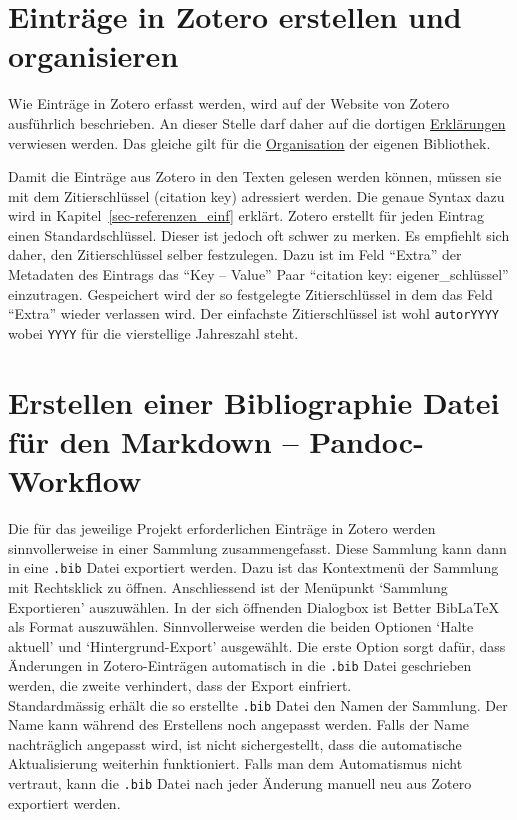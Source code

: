 \documentclass[
  nswissgerman,
  a4paper,
  DIV=11,
  numbers=noendperiod,
  ngerman]{scrreprt}
\begin{document}
\section{Einträge in Zotero erstellen und
organisieren}\label{eintruxe4ge-in-zotero-erstellen-und-organisieren}

Wie Einträge in Zotero erfasst werden, wird auf der Website von Zotero
ausführlich beschrieben. An dieser Stelle darf daher auf die dortigen
\href{https://www.zotero.org/support/adding_items_to_zotero}{Erklärungen}
verwiesen werden. Das gleiche gilt für die
\href{https://www.zotero.org/support/collections_and_tags}{Organisation}
der eigenen Bibliothek.

Damit die Einträge aus Zotero in den Texten gelesen werden können,
müssen sie mit dem Zitierschlüssel (citation key) adressiert werden. Die
genaue Syntax dazu wird in Kapitel~\ref{sec-referenzen_einf} erklärt.
Zotero erstellt für jeden Eintrag einen Standardschlüssel. Dieser ist
jedoch oft schwer zu merken. Es empfiehlt sich daher, den
Zitierschlüssel selber festzulegen. Dazu ist im Feld ``Extra'' der
Metadaten des Eintrags das ``Key -- Value'' Paar ``citation key:
eigener\_schlüssel'' einzutragen. Gespeichert wird der so festgelegte
Zitierschlüssel in dem das Feld ``Extra'' wieder verlassen wird. Der
einfachste Zitierschlüssel ist wohl \texttt{autorYYYY} wobei
\texttt{YYYY} für die vierstellige Jahreszahl steht.

\section{Erstellen einer Bibliographie Datei für den Markdown --
Pandoc-Workflow}\label{erstellen-einer-bibliographie-datei-fuxfcr-den-markdown-pandoc-workflow}

Die für das jeweilige Projekt erforderlichen Einträge in Zotero werden
sinnvollerweise in einer Sammlung zusammengefasst. Diese Sammlung kann
dann in eine \texttt{.bib} Datei exportiert werden. Dazu ist das
Kontextmenü der Sammlung mit Rechtsklick zu öffnen. Anschliessend ist
der Menüpunkt `Sammlung Exportieren' auszuwählen. In der sich öffnenden
Dialogbox ist Better BibLaTeX als Format auszuwählen. Sinnvollerweise
werden die beiden Optionen `Halte aktuell' und `Hintergrund-Export'
ausgewählt. Die erste Option sorgt dafür, dass Änderungen in
Zotero-Einträgen automatisch in die \texttt{.bib} Datei geschrieben
werden, die zweite verhindert, dass der Export einfriert.\\
Standardmässig erhält die so erstellte \texttt{.bib} Datei den Namen der
Sammlung. Der Name kann während des Erstellens noch angepasst werden.
Falls der Name nachträglich angepasst wird, ist nicht sichergestellt,
dass die automatische Aktualisierung weiterhin funktioniert. Falls man
dem Automatismus nicht vertraut, kann die \texttt{.bib} Datei nach jeder
Änderung manuell neu aus Zotero exportiert werden.
\end{document}
